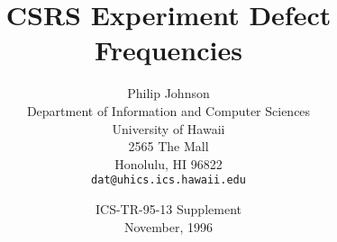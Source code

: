 



 

\title{CSRS Experiment Defect Frequencies}
\author {Philip Johnson \\
         Department of Information and Computer Sciences \\
         University of Hawaii \\
         2565 The Mall\\
         Honolulu, HI 96822\\
         {\tt dat@uhics.ics.hawaii.edu}}

\date {ICS-TR-95-13 Supplement\\ November, 1996}

\maketitle

\tableofcontents
\newpage









